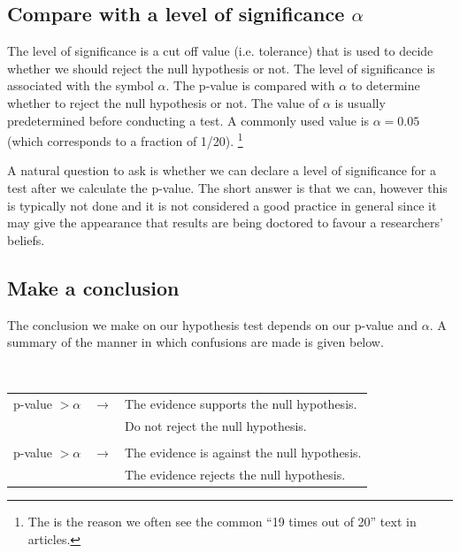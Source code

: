 \subsection{Compare with a level of significance $\alpha$}

The level of significance is a cut off value (i.e. tolerance) that is used to decide whether we 
should reject the null hypothesis or not.
The level of significance is associated with the symbol $\alpha$.
The p-value is compared with $\alpha$ to determine whether to reject the null hypothesis or not.
The value of $\alpha$ is usually predetermined before conducting a test.
A commonly used value is $\alpha = 0.05$ (which corresponds to a fraction of 1/20).
\footnote{The is the reason we often see the common ``19 times out of 20'' text in articles.}

A natural question to ask is whether we can declare a level of significance for a test 
after we calculate the p-value.
The short answer is that we can, however this is typically not done and it is not considered
a good practice in general since it may give the appearance that results are being
doctored to favour a researchers' beliefs.



\pagebreak 

\subsection{Make a conclusion}

The conclusion we make on our hypothesis test depends on our p-value and $\alpha$.
A summary of the manner in which confusions are made is given below.

\begin{termBox}{
\hfill\\
\begin{tabular}{lcl}
p-value $> \alpha$	&	$\longrightarrow$	&	The evidence supports the null hypothesis.\\
				&					&	Do not reject the null hypothesis.		\\
\hfill\\
p-value $> \alpha$	&	$\longrightarrow$	&	The evidence is against the null hypothesis.\\
				&					&	The evidence rejects the null hypothesis.
\end{tabular}
}
\end{termBox}

